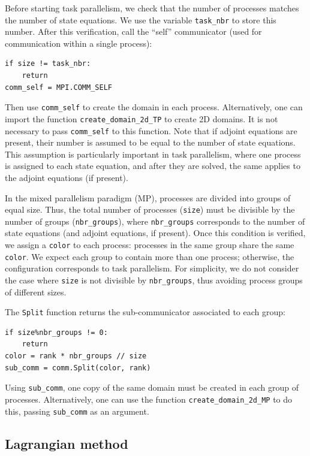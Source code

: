 \documentclass[iicol,pdflatex,sn-mathphys-ay]{sn-jnl}%
\theoremstyle{thmstyleone}%
\theoremstyle{thmstyletwo}%
\theoremstyle{thmstylethree}%
\begin{document}
Before starting task parallelism, we check that the number of processes matches
the number of state equations. We use the variable
\texttt{task\_nbr} to store this number.
After this verification, call the ``self'' communicator
(used for communication within a single process):
\begin{lstlisting}
if size != task_nbr:
    return
comm_self = MPI.COMM_SELF
\end{lstlisting}
Then use \texttt{comm\_self} to create the domain in each process.
Alternatively, one can import the function \texttt{create\_domain\_2d\_TP}
to create 2D domains.
It is not necessary to pass \texttt{comm\_self} to this function.
Note that if adjoint equations are present,
their number is assumed to be equal to the number of state equations.
This assumption is particularly important in task parallelism,
where one process is assigned to each state equation,
and after they are solved,
the same applies to the adjoint equations (if present).

In the mixed parallelism paradigm (MP),
processes are divided into groups of equal size.
Thus, the total number of processes (\texttt{size}) must be divisible
by the number of groups (\texttt{nbr\_groups}), where \texttt{nbr\_groups}
corresponds to the number of state equations
(and adjoint equations, if present).
Once this condition is verified, we assign a \texttt{color} to each process:
processes in the same group share the same \texttt{color}.
We expect each group to contain more than one process;
otherwise, the configuration corresponds to task parallelism.
For simplicity, we do not consider the case where \texttt{size}
is not divisible by \texttt{nbr\_groups},
thus avoiding process groups of different sizes.

The \texttt{Split} function returns the sub-communicator
associated to each group:
\begin{lstlisting}
if size%nbr_groups != 0:
	return
color = rank * nbr_groups // size
sub_comm = comm.Split(color, rank)
\end{lstlisting}
Using \texttt{sub\_comm}, one copy of the same domain must be created
in each group of processes. Alternatively, one can use the function
\texttt{create\_domain\_2d\_MP} to do this,
passing \texttt{sub\_comm} as an argument.

\subsection{Lagrangian method}\label{sub:lagrangian}
\end{document}
